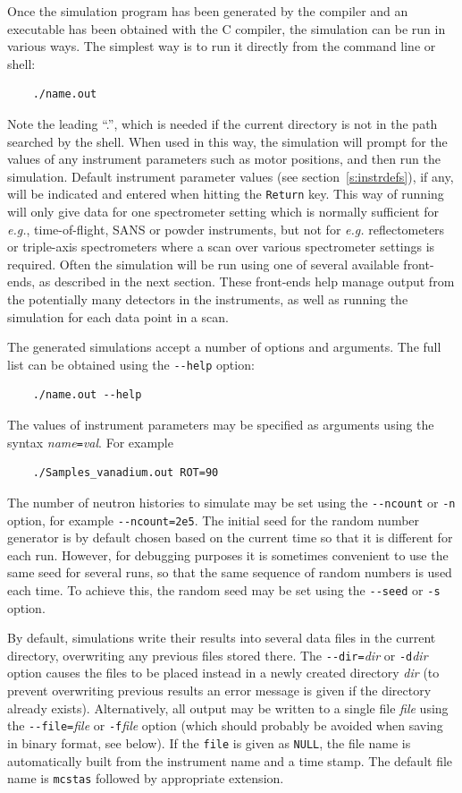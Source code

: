 Once the simulation program has been generated by the \MCS compiler
and an executable has been obtained with the C compiler, the simulation
can be run in various ways. The simplest way is to run it directly from the
command line or shell:
\begin{lstlisting}
    ./name.out
\end{lstlisting}
Note the leading ``.'', which is needed if the current directory is not in
the path searched by the shell. When used in this way, the simulation
will prompt for the values of any instrument parameters such as motor
positions, and then run the simulation. Default instrument parameter values (see section~\ref{s:instrdefs}), if any, will be indicated and entered when hitting the \verb+Return+ key.
This way of running \MCS will only give data for one spectrometer
setting which is normally sufficient for {\em e.g.}, time-of-flight,
SANS or powder instruments, but not for {\em e.g.} reflectometers or triple-axis spectrometers where a scan over
various spectrometer settings is required.
Often the simulation will be run using one of several
available front-ends, as described in the next section. These front-ends
help manage output from the potentially many detectors in the
instruments, as well as running the simulation for each data point in
a scan.

The generated simulations accept a number of options and arguments. The
full list can be obtained using the \verb+--help+ option:
\begin{lstlisting}
    ./name.out --help
\end{lstlisting}
The values of instrument parameters may be specified as arguments using
the syntax \textit{name}\verb+=+\textit{val}. For example
\begin{lstlisting}
    ./Samples_vanadium.out ROT=90
\end{lstlisting}
The number of neutron histories to simulate may be set using the
\verb+--ncount+ or \verb+-n+ option, for example
\verb+--ncount=2e5+. The initial seed for the random number generator is
by default chosen based on the current time so that it is different for
each run. However, for debugging purposes it is sometimes convenient to
use the same seed for several runs, so that the same sequence of random
numbers is used each time. To achieve this, the random seed may be set
using the \verb+--seed+ or \verb+-s+ option.

By default, \MCS simulations write their results into several data files in the
current directory, overwriting any previous files stored there. The
\verb+--dir=+\textit{dir} or \verb+-d+\textit{dir} option causes the files to be
placed instead in a newly created directory \textit{dir} (to prevent overwriting
previous results an error message is given if the directory already exists).
Alternatively, all output may be written to a single file \textit{file} using
the \verb+--file=+\textit{file} or \verb+-f+\textit{file} option (which should
probably be avoided when saving in binary format, see below). If the \verb+file+ is given as \verb+NULL+, the file name is automatically built from the instrument name and a time stamp. The default file name is \verb+mcstas+ followed by appropriate extension.

